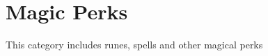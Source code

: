 \chapter{Magic Perks}\label{ch:magicPerks}
This category includes runes, spells and other magical perks

	
	
	